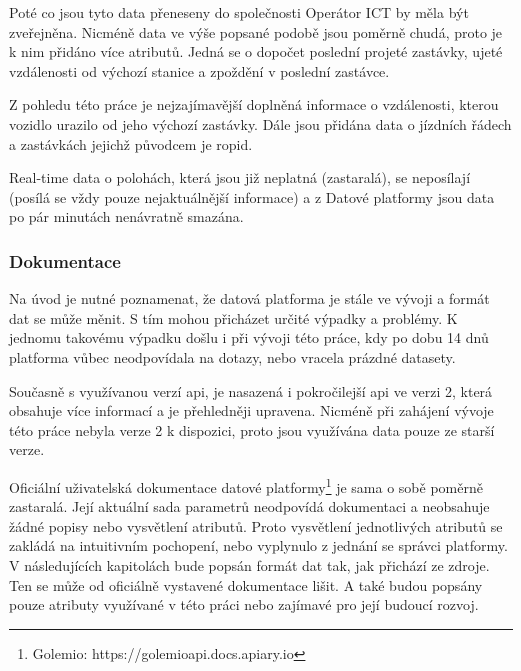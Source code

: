 \bigbreak

Poté co jsou tyto data přeneseny do společnosti Operátor ICT by měla být zveřejněna. Nicméně data ve výše popsané podobě jsou poměrně chudá, proto je k nim přidáno více atributů. Jedná se o dopočet poslední projeté zastávky, ujeté vzdálenosti od výchozí stanice a zpoždění v poslední zastávce.

\bigbreak

Z pohledu této práce je nejzajímavější doplněná informace o vzdálenosti, kterou vozidlo urazilo od jeho výchozí zastávky. Dále jsou přidána data o jízdních řádech a zastávkách jejichž původcem je \gls{ropid}.

\bigbreak

Real-time data o polohách, která jsou již neplatná (zastaralá), se neposílají (posílá se vždy pouze nejaktuálnější informace) a z Datové platformy jsou data po pár minutách nenávratně smazána.

\subsubsection{Dokumentace}

Na úvod je nutné poznamenat, že datová platforma je stále ve vývoji a formát dat se může měnit. S tím mohou přicházet určité výpadky a problémy. K jednomu takovému výpadku došlu i při vývoji této práce, kdy po dobu 14 dnů platforma vůbec neodpovídala na dotazy, nebo vracela prázdné datasety.

\bigbreak

Současně s využívanou verzí \gls{api}, je nasazená i pokročilejší \gls{api} ve verzi 2, která obsahuje více informací a je přehledněji upravena. Nicméně při zahájení vývoje této práce nebyla verze 2 k dispozici, proto jsou využívána data pouze ze starší verze.

\bigbreak

Oficiální uživatelská dokumentace datové platformy\footnote{Golemio: https://golemioapi.docs.apiary.io} je sama o sobě poměrně zastaralá. Její aktuální sada parametrů neodpovídá dokumentaci a neobsahuje žádné popisy nebo vysvětlení atributů. Proto vysvětlení jednotlivých atributů se zakládá na intuitivním pochopení, nebo vyplynulo z jednání se správci platformy. V následujících kapitolách bude popsán formát dat tak, jak přichází ze zdroje. Ten se může od oficiálně vystavené dokumentace lišit. A také budou popsány pouze atributy využívané v této práci nebo zajímavé pro její budoucí rozvoj.

\bigbreak

